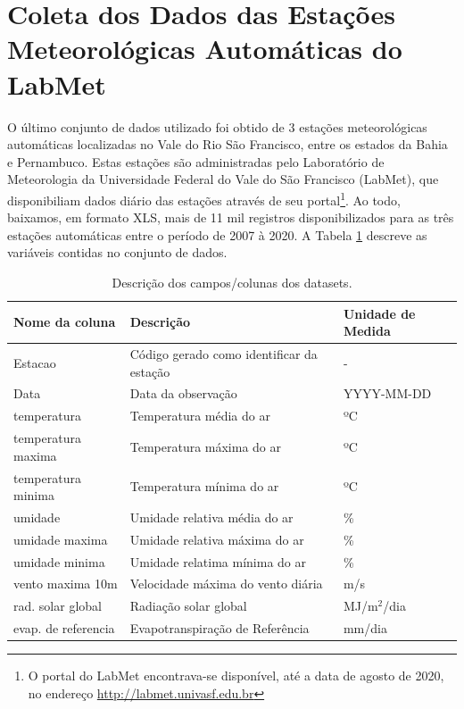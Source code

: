 \section{Coleta dos Dados das Estações Meteorológicas Automáticas do LabMet}

O último conjunto de dados utilizado foi obtido de 3 estações meteorológicas automáticas localizadas no Vale do Rio São Francisco, entre os estados da Bahia e Pernambuco. Estas estações são administradas pelo Laboratório de Meteorologia da Universidade Federal do Vale do São Francisco (LabMet), que disponibiliam dados diário das estações através de seu portal\footnote{O portal do LabMet encontrava-se disponível, até a data de agosto de 2020, no endereço \href{http://labmet.univasf.edu.br}{http://labmet.univasf.edu.br}}. Ao todo, baixamos, em formato XLS, mais de 11 mil registros disponibilizados para as três estações automáticas entre o período de 2007 à 2020. A Tabela \ref{tab:estacoes_automaticas_labmet} descreve as variáveis contidas no conjunto de dados. 

\begin{table}[h!]
\caption{Descrição dos campos/colunas dos datasets.}
\label{tab:estacoes_automaticas_labmet}
\begin{tabular}{|l|l|l|}
\hline
\textbf{Nome da coluna} & \textbf{Descrição} & \textbf{Unidade de Medida}\\
\hline
Estacao & Código gerado como identificar da estação & - \\
\hline
Data & Data da observação & YYYY-MM-DD\\
\hline
temperatura & Temperatura média do ar & ºC\\
\hline
temperatura maxima & Temperatura máxima do ar & ºC\\
\hline
temperatura minima & Temperatura mínima do ar & ºC\\
\hline
umidade & Umidade relativa média do ar & \% \\
\hline
umidade maxima & Umidade relativa máxima do ar & \% \\
\hline
umidade minima & Umidade relatima mínima do ar & \% \\
\hline
vento maxima 10m & Velocidade máxima do vento diária  & m/s \\
\hline
rad. solar global & Radiação solar global  & MJ/m$^2$/dia\\
\hline
evap. de referencia & Evapotranspiração de Referência & mm/dia\\
\hline
\end{tabular}
\end{table}